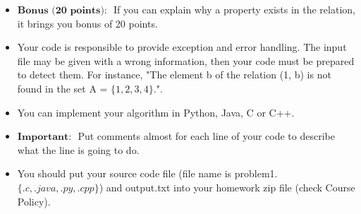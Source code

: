 \documentclass[a4 paper]{article}
\numberwithin{equation}{section}
\newcommand{\0}{\mathbf{0}}
\begin{document}
\begin{itemize}
	\item $\textbf{Bonus (20 points): }$ If you can explain why a property exists in the relation, it brings you bonus of 20 points.
	\item Your code is responsible to provide exception and error handling. The input file may be given with a wrong information, then your code must be prepared to detect them. For instance, "The element b of the relation (1, b) is not found in the set A = $\{1, 2, 3, 4\}$.".
	\item You can implement your algorithm in Python, Java, C or C++.
	\item $\textbf{Important: }$ Put comments almost for each line of your code to describe what the line is going to do. 
	\item You should put your source code file (file name is problem1.$\{.c, .java, .py, .cpp\}$) and output.txt into your homework zip file (check Course Policy).
\end{itemize}
\end{document}

